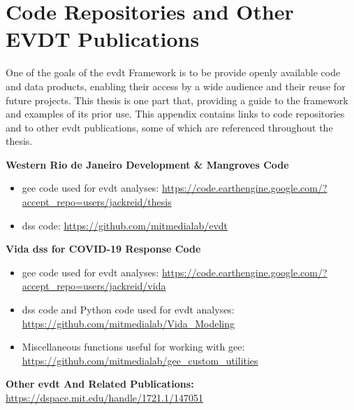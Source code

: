 \chapter{Code Repositories and Other EVDT Publications} \label{app:code}

One of the goals of the \ac{evdt} Framework is to be provide openly available code and data products, enabling their access by a wide audience and their reuse for future projects. This thesis is one part that, providing a guide to the framework and examples of its prior use. This appendix contains links to code repositories and to other \ac{evdt} publications, some of which are referenced throughout the thesis.

\textbf{Western Rio de Janeiro Development \& Mangroves Code}

\begin{itemize}[itemsep=0pt,parsep=0pt]
	\item{\ac{gee} code used for \ac{evdt} analyses: \url{https://code.earthengine.google.com/?accept_repo=users/jackreid/thesis}}
	\item{\ac{dss} code: \url{https://github.com/mitmedialab/evdt}}
\end{itemize}


\textbf{Vida \ac{dss} for COVID-19 Response Code}

\begin{itemize}[itemsep=0pt,parsep=0pt]
	\item{\ac{gee} code used for \ac{evdt} analyses: \url{https://code.earthengine.google.com/?accept_repo=users/jackreid/vida}}
	\item{\ac{dss} code and Python code used for \ac{evdt} analyses: \url{https://github.com/mitmedialab/Vida_Modeling}}
	\item{Miscellaneous functions useful for working with \ac{gee}: \url{https://github.com/mitmedialab/gee_custom_utilities}}
\end{itemize}

\textbf{Other \ac{evdt} And Related Publications:} \url{https://dspace.mit.edu/handle/1721.1/147051}